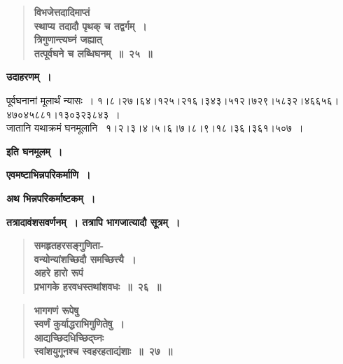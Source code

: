 \documentclass[11pt, openany]{book}
\begin{document}
\newpage

 \label{1.25}
\begin{quote}
{\large \textbf{{\color{purple}विभजेत्तदादिमाप्तं \\
स्थाप्य तदादौ पृथक् च तद्वर्गम्~।\\
त्रिगुणान्त्यघ्नं जह्यात् \\
तत्पूर्वघने च लब्धिघनम्~॥~२५~॥}}}
\end{quote}

\noindent \textbf{उदाहरणम्~।}\\
\vspace{-2mm}

पूर्वघनानां मूलार्थं न्यासः~। १।८।२७।६४।१२५।२१६।३४३।५१२।७२९।५८३२।४६६५६।\\
४७०४५८८१।१३०३२३८४३~।\\

जातानि यथाक्रमं घनमूलानि ~१।२।३।४।५।६।७।८।९।१८।३६।३६१।५०७~।
\vspace{2mm}

\begin{center}
\textbf{इति घनमूलम्~।}\\
\vspace{4mm}

\textbf{एवमष्टाभिन्नपरिकर्माणि~।}\\
\vspace{8mm}

{\Large \textbf{अथ भिन्नपरिकर्माष्टकम्~।}} \\
\vspace{4mm}

\textbf{तत्रादावंशसवर्णनम्~। तत्रापि भागजात्यादौ सूत्रम्~।}
\end{center}
\vspace{-3mm}

 \label{1.26}
\begin{quote}
{\large \textbf{{\color{purple}समहृतहरसङ्गुणिता-\\
वन्योन्यांशच्छिदौ समच्छित्त्यै~। \\
अहरे हारो रूपं \\
प्रभागके हरवधस्तथांशवधः~॥~२६~॥}}}
\end{quote}
\vspace{-8mm}

 \label{1.27}
\begin{quote}
{\large \textbf{{\color{purple}भागगणं रूपेषु \\
स्वर्णं कुर्याद्धराभिगुणितेषु~।\\ 
आद्यच्छिदधिच्छिद्घ्नः \\
स्वांशयुगूनश्च स्वहरहताद्यंशाः~॥~२७~॥}}}
\end{quote}
\end{document}
